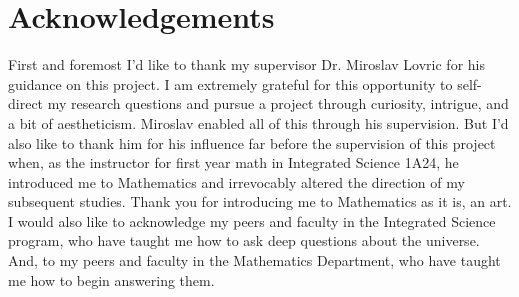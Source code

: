\chapter*{Acknowledgements}
First and foremost I'd like to thank my supervisor Dr. Miroslav Lovric for his guidance on this project. I am extremely grateful for this opportunity to self-direct my research questions and pursue a project through curiosity, intrigue, and a bit of aestheticism. Miroslav enabled all of this through his supervision. But I'd also like to thank him for his influence far before the supervision of this project when, as the instructor for first year math in Integrated Science 1A24, he introduced me to Mathematics and irrevocably altered the direction of my subsequent studies. Thank you for introducing me to Mathematics as it is, an art.\\
I would also like to acknowledge my peers and faculty in the Integrated Science program, who have taught me how to ask deep questions about the universe. And, to my peers and faculty in the Mathematics Department, who have taught me how to begin answering them.